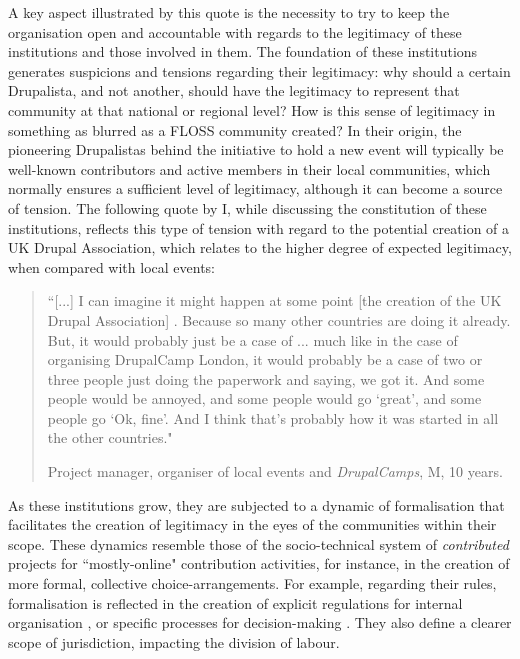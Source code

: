 A key aspect illustrated by this quote is the necessity to try to keep the organisation open and accountable with regards to the legitimacy of these institutions and those involved in them. The foundation of these institutions generates suspicions and tensions regarding their legitimacy: why should a certain Drupalista, and not another, should have the legitimacy to represent that community at that national or regional level? How is this sense of legitimacy in something as blurred as a FLOSS community created? In their origin, the pioneering Drupalistas behind the initiative to hold a new event will typically be well-known contributors and active members in their local communities, which normally ensures a sufficient level of legitimacy, although it can become a source of tension. The following quote by I, while discussing the constitution of these institutions, reflects this type of tension with regard to the potential creation of a UK Drupal Association, which relates to the higher degree of expected legitimacy, when compared with local events:

\begin{quotation}
``[...] I can imagine it might happen at some point [the creation of the UK Drupal Association] . Because so many other countries are doing it already. But, it would probably just be a case of ... much like in the case of organising DrupalCamp London, it would probably be a case of two or three people just doing the paperwork and saying, we got it. And some people would be annoyed, and some people would go `great', and some people go `Ok, fine'. And I think that's probably how it was started in all the other countries."

\begin{flushright}\footnotesize{Project manager, organiser of local events and \textit{DrupalCamps}, M, 10 years.}\end{flushright}
\end{quotation}

As these institutions grow, they are subjected to a dynamic of formalisation that facilitates the creation of legitimacy in the eyes of the communities within their scope. These dynamics resemble those of the socio-technical system of \textit{contributed} projects for ``mostly-online" contribution activities, for instance, in the creation of more formal, collective choice-arrangements. For example, regarding their rules, formalisation is reflected in the creation of explicit regulations for internal organisation \parencite[e.g.][]{aed-estatutos:2016:Online}, or specific processes for decision-making \parencite[e.g.][]{aed-toma-decisiones:2016:Online}. They also define a clearer scope of jurisdiction, impacting the division of labour.


